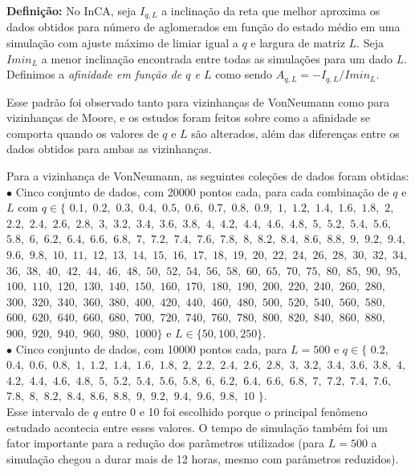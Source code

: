 \documentclass[
	12pt,				%
	openright,			%
	twoside,			%
	a4paper,			%
	english,			%
	french,				%
	spanish,			%
	brazil				%
	]{abntex2}
\begin{document}
\textbf{Definição:} No InCA, seja $I_{q,L}$ a inclinação da reta que melhor aproxima os dados obtidos para número de aglomerados em função do estado médio em uma simulação com ajuste máximo de limiar igual a $q$ e largura de matriz $L$. Seja $Imin_L$ a menor inclinação encontrada entre todas as simulações para um dado $L$. Definimos a \textit{afinidade em função de $q$ e $L$} como sendo $A_{q,L}=-I_{q,L}/Imin_L$.

Esse padrão foi observado tanto para vizinhanças de VonNeumann como para vizinhanças de Moore, e os estudos foram feitos sobre como a afinidade se comporta quando os valores de $q$ e $L$ são alterados, além das diferenças entre os dados obtidos para ambas as vizinhanças.

Para a vizinhança de VonNeumann, as seguintes coleções de dados foram obtidas:\\
$\bullet$ Cinco conjunto de dados, com 20000 pontos cada, para cada combinação de $q$ e $L$ com $q\in\{$ 
  $0.1,$ $0.2,$ $0.3,$ $0.4,$ $0.5,$ $0.6,$ $0.7,$ $0.8,$ $0.9,$
  $1,$ $1.2,$ $1.4,$ $1.6,$ $1.8,$ 
  $2,$ $2.2,$ $2.4,$ $2.6,$ $2.8,$ 
  $3,$ $3.2,$ $3.4,$ $3.6,$ $3.8,$
  $4,$ $4.2,$ $4.4,$ $4.6,$ $4.8,$
  $5,$ $5.2,$ $5.4,$ $5.6,$ $5.8,$
  $6,$ $6.2,$ $6.4,$ $6.6,$ $6.8,$
  $7,$ $7.2,$ $7.4,$ $7.6,$ $7.8,$
  $8,$ $8.2,$ $8.4,$ $8.6,$ $8.8,$
  $9,$ $9.2,$ $9.4,$ $9.6,$ $9.8,$ $10,$
  $11,$ $12,$ $13,$ $14,$ $15,$ $16,$ $17,$ $18,$ $19,$ $20,$
  $22,$ $24,$ $26,$ $28,$ $30,$ $32,$ $34,$ $36,$ $38,$ $40,$
  $42,$ $44,$ $46,$ $48,$ $50,$ $52,$ $54,$ $56,$ $58,$ $60,$
  $65,$ $70,$ $75,$ $80,$ $85,$ $90,$ $95,$ $100,$ $110,$
  $120,$ $130,$ $140,$ $150,$ $160,$ $170,$ $180,$ $190,$
  $200,$ $220,$ $240,$ $260,$ $280,$ $300,$ $320,$ $340,$ $360,$ $380,$
  $400,$ $420,$ $440,$ $460,$ $480,$ $500,$ $520,$ $540,$ $560,$ $580,$
  $600,$ $620,$ $640,$ $660,$ $680,$ $700,$ $720,$ $740,$ $760,$ $780,$
  $800,$ $820,$ $840,$ $860,$ $880,$ $900,$ $920,$ $940,$ $960,$ $980,$
	$1000\}$ e $L\in \{50, 100, 250\}$.\\
	$\bullet$ Cinco conjunto de dados, com 10000 pontos cada, para $L=500$ e $q\in\{$
  $0.2,$ $0.4,$ $0.6,$ $0.8,$ $1,$
  $1.2,$ $1.4,$ $1.6,$ $1.8,$	$2,$
  $2.2,$ $2.4,$ $2.6,$ $2.8,$ $3,$
  $3.2,$ $3.4,$ $3.6,$ $3.8,$ $4,$
  $4.2,$ $4.4,$ $4.6,$ $4.8,$ $5,$
  $5.2,$ $5.4,$ $5.6,$ $5.8,$ $6,$
  $6.2,$ $6.4,$ $6.6,$ $6.8,$ $7,$
  $7.2,$ $7.4,$ $7.6,$ $7.8,$ $8,$
  $8.2,$ $8.4,$ $8.6,$ $8.8,$ $9,$
  $9.2,$ $9.4,$ $9.6,$ $9.8,$ $10$
	$\}$. \\
	Esse intervalo de $q$ entre 0 e 10 foi escolhido porque o principal fenômeno estudado acontecia entre esses valores. O tempo de simulação também foi um fator importante para a redução dos parâmetros utilizados (para $L=500$ a simulação chegou a durar mais de 12 horas, mesmo com parâmetros reduzidos).
\end{document}
